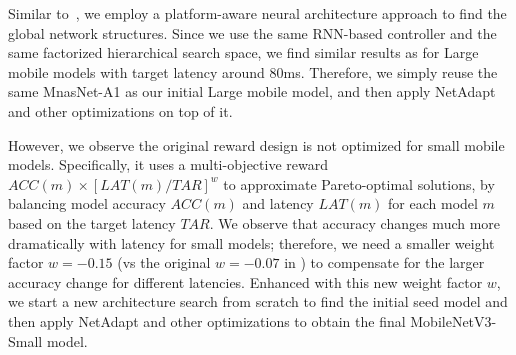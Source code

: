 \documentclass[10pt,twocolumn,letterpaper]{article}
\newcommand{\omt}[1]{}
\begin{document}
\omt{
We employ a similar factorized search space as \cite{mnasnet} to explore the initial model candidates. Specifically, we partition the network into a list of predefined stages, and search for layer architectures for each stage respectively. However, unlike MnasNet \cite{mnasnet} that restricts all layers to be the same in each stage, we also search the kernel size and expansion ratio for each individual layer in each stage, thus permitting more layer diversity throughout the
network. Similarly to \cite{mnasnet}, we use MobileNetV2~\cite{mobilenetv2} as a reference, and
search for convolutional op types, expansion ratios (3 or 6), kernel sizes (3x3 or 5x5),
squeeze-and-excite ratio (0.5, 0.25, or 0.125). For each stage, we also search for the number of
layers (0, +1, or -1) and the filter sizes with ratio of (0.75, 1.0, or 1.2) respective to MobileNetV2~
\cite{mobilenetv2}

Similar to MnasNet \cite{mnasnet}, we use a RNN-based controller
with the same multi-objective reward $ACC(m) \times \left[LAT(m)/T \right] ^ w$, which approximates the Pareto-optimal solutions by balancing model accuracy $ACC(m)$ and latency $LAT(m)$ for each model $m$ based on the target latency $T$. For big models with 75ms target latency, we use the same coefficients $w=-0.07$ as \cite{mnasnet}, but for small models, we observe that accuracy changes more dramatically with latency; therefore, we use a smaller co-efficient $w=-0.15$ to compensate for the larger accuracy change for different latencies.
}

Similar to~\cite{mnasnet}, we employ a platform-aware neural architecture approach to find the global network structures. Since we use the same RNN-based controller and the same factorized hierarchical search space, we find similar results as \cite{mnasnet} for Large mobile models with target latency around 80ms. Therefore, we simply reuse the same MnasNet-A1 \cite{mnasnet} as our initial Large mobile model, and then apply NetAdapt \cite{NetAdapt} and other optimizations on top of it.

However, we observe the original reward design is not optimized for small mobile models. Specifically, it uses a multi-objective reward $ACC(m) \times \left[LAT(m)/TAR \right] ^ w$ to approximate Pareto-optimal solutions, by balancing model accuracy $ACC(m)$ and latency $LAT(m)$ for each model $m$ based on the target latency $TAR$. We observe that accuracy changes much more dramatically with latency for small models; therefore, we need a smaller weight factor $w=-0.15$ (vs the original $w=-0.07$ in \cite{mnasnet}) to compensate for the larger accuracy change for different latencies. Enhanced with this new weight factor $w$, we start a new architecture search from scratch to find the initial seed model  and then apply NetAdapt and other optimizations to obtain the final MobileNetV3-Small model.
\end{document}
